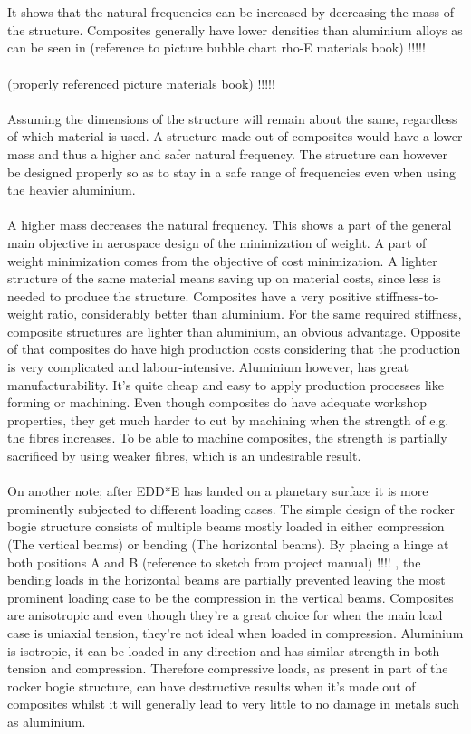 \\
\\
It shows that the natural frequencies can be increased by decreasing the mass of the structure. Composites generally have lower densities than aluminium alloys as can be seen in (reference to picture bubble chart rho-E materials book)    !!!!!
\\
\\
(properly referenced picture materials book)     !!!!!
\\
\\
Assuming the dimensions of the structure will remain about the same, regardless of which material is used. A structure made out of composites would have a lower mass and thus a higher and safer natural frequency. The structure can however be designed properly so as to stay in a safe range of frequencies even when using the heavier aluminium.
\\
\\
A higher mass decreases the natural frequency. This shows a part of the general main objective in aerospace design of the minimization of weight. A part of weight minimization comes from the objective of cost minimization. A lighter structure of the same material means saving up on material costs, since less is needed to produce the structure. Composites have a very positive stiffness-to-weight ratio, considerably better than aluminium. For the same required stiffness, composite structures are lighter than aluminium, an obvious advantage. Opposite of that composites do have high production costs considering that the production is very complicated and labour-intensive. Aluminium however, has great manufacturability. It’s quite cheap and easy to apply production processes like forming or machining. Even though composites do have adequate workshop properties, they get much harder to cut by machining when the strength of e.g. the fibres increases. To be able to machine composites, the strength is partially sacrificed by using weaker fibres, which is an undesirable result.
\\
\\
On another note; after EDD*E has landed on a planetary surface it is more prominently subjected to different loading cases. The simple design of the rocker bogie structure consists of multiple beams mostly loaded in either compression (The vertical beams) or bending (The horizontal beams). By placing a hinge at both positions A and B (reference to sketch from project manual)      !!!!     , the bending loads in the horizontal beams are partially prevented leaving the most prominent loading case to be the compression in the vertical beams. Composites are anisotropic and even though they’re a great choice for when the main load case is uniaxial tension, they’re not ideal when loaded in compression. Aluminium is isotropic, it can be loaded in any direction and has similar strength in both tension and compression. Therefore compressive loads, as present in part of the rocker bogie structure, can have destructive results when it’s made out of composites whilst it will generally lead to very little to no damage in metals such as aluminium.
